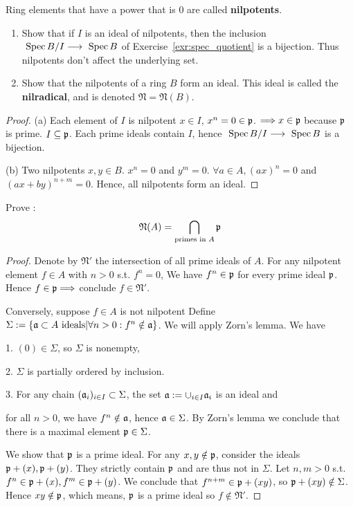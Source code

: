 \begin{exr}\label{exr:nilpotents_bijection}
Ring elements that have a power that is $0$ are called \textbf{nilpotents}. 
\begin{enumerate}[label=(\alph*)]
\item 
 Show that if $I$ is an ideal of nilpotents, then the inclusion $\text{ Spec\,} B/I \longrightarrow \text{ Spec\,} B$ of Exercise~\ref{exr:spec_quotient} is a bijection. Thus nilpotents don’t affect the underlying set. 
\item Show that the nilpotents of a ring $B$ form an ideal. This ideal is called the \textbf{nilradical}, and is denoted $\mathfrak{N} = \mathfrak{N}(B)$.
\end{enumerate}
\end{exr}
\begin{proof}
(a) Each element of $I$ is nilpotent $x\in I$, $x^n=0\in{\mathfrak p}$. $\Longrightarrow x\in{\mathfrak p}$ because ${\mathfrak p}$ is prime. $I\subseteq{\mathfrak p}$. Each prime ideals contain $I$, hence $\text{ Spec\,} B/I\longrightarrow \text{ Spec\,} B$ is a bijection.

(b) Two nilpotents $x,y\in B$.
$x^n=0$ and $y^m=0$. $\forall a\in A, (ax)^n=0$ and $(ax+by)^{n+m}=0$. Hence, all nilpotents form an ideal.
\end{proof}

\begin{exr}
Prove : 
$$
\mathfrak{N}(A)=\bigcap_{\text{primes in }A}{\mathfrak p}
$$
\end{exr}
\begin{proof}
Denote by $\mathfrak{N}'$ the intersection of all prime ideals of ${A}$.
For any nilpotent element $f\in {A}$ with $n>0$ s.t. $f^n=0$,
We have $f^n\in {\mathfrak p}$ for every prime ideal ${\mathfrak p}$. Hence $f\in {\mathfrak p}\Longrightarrow$ conclude $f\in \mathfrak{N}'$.

Conversely, suppose $f\in {A}$ is not nilpotent 
Define $\Sigma:=\{ {\mathfrak a} \subset A\text{ ideals} | \forall n>0: f^n\notin {\mathfrak a}\}$.
We will apply Zorn's lemma. 
We have 

    1.  $(0)\in \Sigma$, so $\Sigma$ is nonempty,

    2.  $\Sigma$ is partially ordered by inclusion.

    3.  For any chain $({\mathfrak a}_i)_{i\in I}\subset \Sigma$, the set ${\mathfrak a} :=\cup_{i\in I}{\mathfrak a}_i$ is an ideal and 

    for all $n>0$, 
    we have $f^n \notin {\mathfrak a}$, hence ${\mathfrak a} \in \Sigma$.
By Zorn's lemma we conclude that there is a maximal element ${\mathfrak p}\in \Sigma$.

We show that ${\mathfrak p}$ is a prime ideal.
For any $x,y \notin {\mathfrak p}$, consider the ideals
${\mathfrak p}+(x), {\mathfrak p}+(y)$. They strictly contain ${\mathfrak p}$ and are thus not in $\Sigma$.
Let $n,m>0$ s.t. $f^n\in {\mathfrak p}+(x), f^m\in {\mathfrak p}+(y)$.
We conclude that $f^{n+m}\in {\mathfrak p}+(xy)$, so ${\mathfrak p}+(xy) \notin \Sigma$.
Hence $xy \notin {\mathfrak p}$, which means, ${\mathfrak p} $ is a prime ideal so $f \notin \mathfrak{N}'$.
\end{proof}

